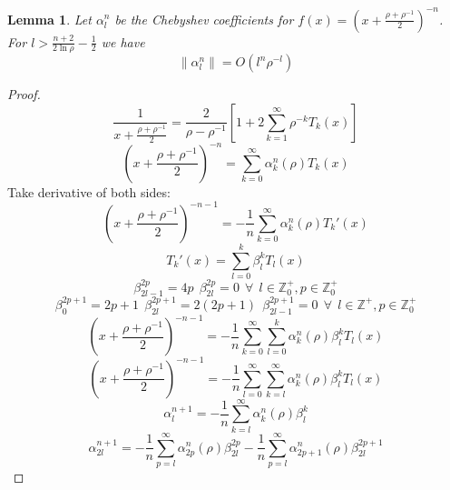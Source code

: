 \documentclass[aps]{revtex4-2}
\newtheorem{lemma}[theorem]{Lemma}
\begin{document}
\begin{lemma}
    Let $\alpha_l^n$ be the Chebyshev coefficients for $f(x)=\left(x+\frac{\rho+\rho^{-1}}{2}\right)^{-n}$. For $l> \frac{n+2}{2\ln \rho}-\frac{1}{2}$ we have
    \begin{equation}
        \|\alpha_l^n\| = O(l^n\rho^{-l})
    \end{equation}
    \end{lemma}
\begin{proof}
\begin{equation}
    \frac{1}{x+\frac{\rho+\rho^{-1}}{2}} = \frac{2}{\rho-\rho^{-1}}\left[1+2\sum_{k=1}^{\infty} \rho^{-k}T_k(x)\right]
\end{equation}
\begin{equation}
    \left(x+\frac{\rho+\rho^{-1}}{2}\right)^{-n} = \sum_{k=0}^{\infty} \alpha_k^n(\rho) T_k(x)
\end{equation}
Take derivative of both sides:
\begin{equation}
    \left(x+\frac{\rho+\rho^{-1}}{2}\right)^{-n-1} = -\frac{1}{n}\sum_{k=0}^{\infty} \alpha_k^n(\rho) T_k'(x)
\end{equation}
\begin{equation}
    T_k'(x) = \sum_{l=0}^{k} \beta_l^k T_l(x)
\end{equation}
\begin{equation}
    \beta_{2l-1}^{2p} = 4p \>\> \beta_{2l}^{2p} = 0  \>\>\forall\>\> l \in \mathbb{Z}_0^+, p \in \mathbb{Z}_0^+ 
\end{equation}
\begin{equation}
    \beta_{0}^{2p+1} = 2p+1\>\> \beta_{2l}^{2p+1} = 2(2p+1) \>\> \beta_{2l-1}^{2p+1} = 0 \>\>\forall\>\> l \in \mathbb{Z}^+, p \in \mathbb{Z}_0^+ 
\end{equation}
\begin{equation}
    \left(x+\frac{\rho+\rho^{-1}}{2}\right)^{-n-1} = -\frac{1}{n}\sum_{k=0}^{\infty} \sum_{l=0}^{k}\alpha_k^n(\rho)  \beta_l^k T_l(x)
\end{equation}
\begin{equation}
    \left(x+\frac{\rho+\rho^{-1}}{2}\right)^{-n-1} = -\frac{1}{n} \sum_{l=0}^{\infty}\sum_{k=l}^{\infty}\alpha_k^n(\rho)  \beta_l^k T_l(x)
\end{equation}
\begin{equation}
    \alpha^{n+1}_l =  -\frac{1}{n} \sum_{k=l}^{\infty}\alpha_k^n(\rho)  \beta_l^k
\end{equation}
\begin{equation}
    \alpha^{n+1}_{2l} =  -\frac{1}{n} \sum_{p=l}^{\infty}\alpha_{2p}^n(\rho)  \beta_{2l}^{2p}  -\frac{1}{n} \sum_{p=l}^{\infty}\alpha_{2p+1}^n(\rho)  \beta_{2l}^{2p+1} 

\end{equation}
\end{proof}
\end{document}
